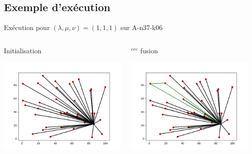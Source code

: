 \documentclass{beamer}
\begin{document}
\subsection{Exemple d'exécution}
\begin{frame}{Exécution pour $(\lambda,\mu,\nu) = (1,1,1)$ sur A-n37-k06}

 \begin{columns}[t]
  \begin{column}{4cm}
  	\centering
  	Initialisation
  	
	\includegraphics[scale=0.2]{CWinit.png}
	
	
  \end{column}
  
  \begin{column}{4cm}
  	$^{ere}$ fusion
  	
	\includegraphics[scale=0.2]{CW1.png}
 

\end{column}
\end{columns}
\end{frame}
\end{document}
